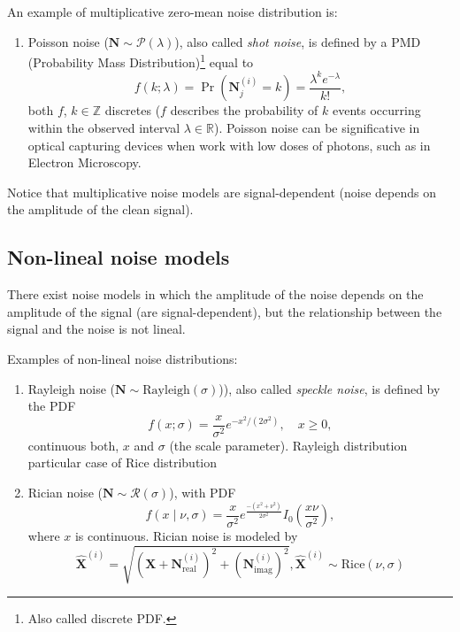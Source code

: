 \documentclass{article}
\begin{document}
An example of multiplicative zero-mean noise distribution is:

\begin{enumerate}
\item Poisson noise ($\mathbf{N}\sim\mathcal{P}(\lambda)$), also
  called \emph{shot noise}, is defined by a PMD (Probability Mass
  Distribution)\footnote{Also called discrete PDF.} equal to
  \begin{equation}
    f(k; \lambda) = \Pr({\mathbf N}^{(i)}_j{=}k) = \frac{\lambda^k e^{-\lambda}}{k!},
  \end{equation}
  both $f$, $k\in\mathbb{Z}$ discretes ($f$ describes the probability
  of $k$ events occurring within the observed interval
  $\lambda\in\mathbb{R}$). Poisson noise can be significative in
  optical capturing devices when work with low doses of photons, such
  as in Electron Microscopy.
\end{enumerate}

Notice that multiplicative noise models are signal-dependent (noise depends
on the amplitude of the clean signal).

\subsection{Non-lineal noise models}

There exist noise models in which the amplitude of the noise depends
on the amplitude of the signal (are signal-dependent), but the
relationship between the signal and the noise is not lineal.

Examples of non-lineal noise distributions:

\begin{enumerate}
\item Rayleigh noise ($\mathbf{N}\sim\mathrm{Rayleigh}(\sigma)$)),
  also called \emph{speckle noise}, is defined by the PDF
  \begin{equation}
    f(x; \sigma) = \frac{x}{\sigma^2} e^{-x^2/(2\sigma^2)}, \quad x \geq 0,
  \end{equation}
  continuous both, $x$ and $\sigma$ (the scale parameter). Rayleigh
  distribution particular case of Rice distribution
\item Rician noise ($\mathbf{N}\sim\mathcal{R}(\sigma)$), with PDF
  \begin{equation}
    f(x\mid\nu,\sigma) = \frac{x}{\sigma^2}e^{\frac{-(x^2+\nu^2)}{2\sigma^2}}I_0\left(\frac{x\nu}{\sigma^2}\right),
  \end{equation}
  where $x$ is continuous. Rician noise is modeled by
\begin{equation}
  \hat{\mathbf X}^{(i)} = \sqrt{ ({\mathbf X} + {\mathbf N}_{\text{real}}^{(i)})^2 + ({\mathbf N}_{\text{imag}}^{(i)})^2}, \hat{\mathbf X}^{(i)}\sim\text{Rice}(\nu,\sigma)
\end{equation}
\end{enumerate}
\end{document}
